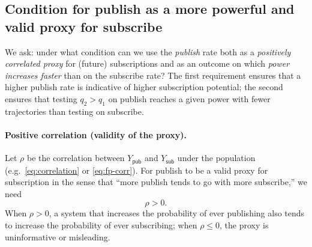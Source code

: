 \subsection{Condition for publish as a more powerful and valid proxy for subscribe}
\label{sec:method:proxy-condition}

We ask: under what condition can we use the \emph{publish} rate both as a \emph{positively correlated proxy} for (future) subscriptions and as an outcome on which \emph{power increases faster} than on the subscribe rate? The first requirement ensures that a higher publish rate is indicative of higher subscription potential; the second ensures that testing $q_2 > q_1$ on publish reaches a given power with fewer trajectories than testing on subscribe.

\paragraph{Positive correlation (validity of the proxy).}
Let $\rho$ be the correlation between $Y_{\mathsf{pub}}$ and $Y_{\mathsf{sub}}$ under the population (e.g.\ \eqref{eq:correlation} or \eqref{eq:fp-corr}). For publish to be a valid proxy for subscription in the sense that ``more publish tends to go with more subscribe,'' we need
\begin{equation}
  \rho > 0. \label{eq:proxy-valid}
\end{equation}
When $\rho > 0$, a system that increases the probability of ever publishing also tends to increase the probability of ever subscribing; when $\rho \leq 0$, the proxy is uninformative or misleading.

